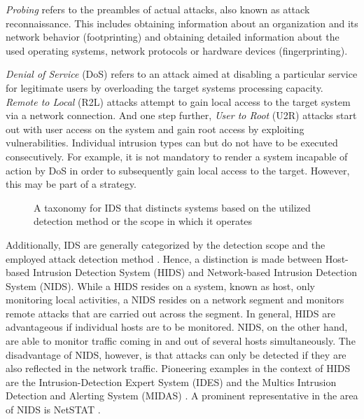 \documentclass[../../../main.tex]{subfiles}
\begin{document}
\textit{Probing} refers to the preambles of actual attacks, also known as attack reconnaissance. This includes obtaining information about an organization and its network behavior (footprinting) and obtaining detailed information about the used operating systems, network protocols or hardware devices (fingerprinting). 

\textit{Denial of Service} (DoS) refers to an attack aimed at disabling a particular service for legitimate users by overloading the target systems processing capacity. \textit{Remote to Local} (R2L) attacks attempt to gain local access to the target system via a network connection. And one step further, \textit{User to Root} (U2R) attacks start out with user access on the system and gain root access by exploiting vulnerabilities. Individual intrusion types can but do not have to be executed consecutively. For example, it is not mandatory to render a system incapable of action by DoS in order to subsequently gain local access to the target. However, this may be part of a strategy.

\begin{figure}[b]
    \centering
    
    \caption{A taxonomy for IDS that distincts systems based on the utilized detection method or the  scope in which it operates}
    \label{fig:ids-taxonomy}
\end{figure}

Additionally, IDS are generally categorized by the detection scope and the employed attack detection method \cite{milenkoski2015evaluating}. Hence, a distinction is made between Host-based Intrusion Detection System (HIDS) and Network-based Intrusion Detection System (NIDS). While a HIDS resides on a system, known as host, only monitoring local activities, a NIDS resides on a network segment and monitors remote attacks that are carried out across the segment. In general, HIDS are advantageous if individual hosts are to be monitored. NIDS, on the other hand, are able to monitor traffic coming in and out of several hosts simultaneously. The disadvantage of NIDS, however, is that attacks can only be detected if they are also reflected in the network traffic. Pioneering examples in the context of HIDS are the Intrusion-Detection Expert System (IDES) \cite{lunt1992real} and the Multics Intrusion Detection and Alerting System (MIDAS) \cite{sebring1988expert}. A prominent representative in the area of NIDS is NetSTAT \cite{vigna1998netstat} \cite{vigna1999netstat}.
\end{document}
